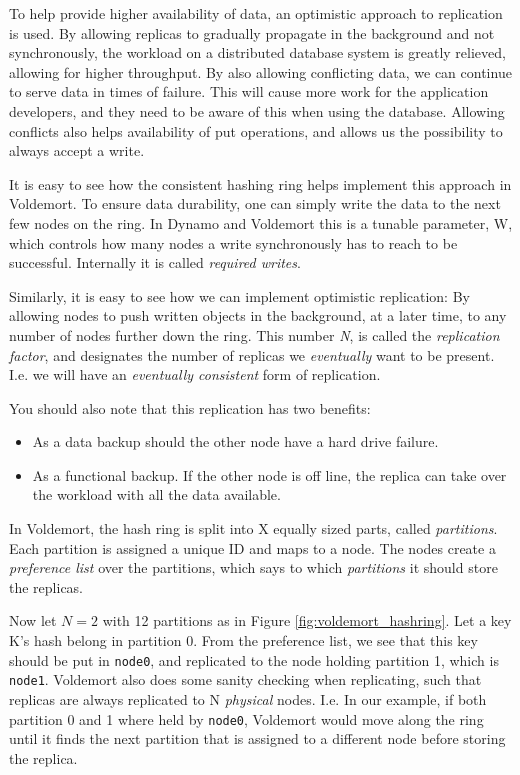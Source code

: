 To help provide higher availability of data, an optimistic approach to replication is used.
By allowing replicas to gradually propagate in the background and not synchronously, the workload on a distributed database system is greatly relieved, allowing for higher throughput. By also allowing conflicting data, we can continue to serve data in times of failure. This will cause more work for the application developers, and they need to be aware of this when using the database. Allowing conflicts also helps availability of put operations, and allows us the possibility to always accept a write.

It is easy to see how the consistent hashing ring helps implement this approach in Voldemort.
To ensure data durability, one can simply write the data to the next few nodes on the ring. In Dynamo and Voldemort this is a tunable parameter, W, which controls how many nodes a write synchronously has to reach to be successful. 
Internally it is called \emph{required writes}.

Similarly, it is easy to see how we can implement optimistic replication:
By allowing nodes to push written objects in the background, at a later time, to any number of nodes further down the ring.
This number \emph{N}, is called the \emph{replication factor}, and designates the number of replicas we \emph{eventually} want to be present.
I.e. we will have an \emph{eventually consistent} form of replication.

You should also note that this replication has two benefits: 
\begin{itemize}
	\item As a data backup should the other node have a hard drive failure.
	\item As a functional backup. If the other node is off line, the replica can take over the workload with all the data available.
\end{itemize}

In Voldemort, the hash ring is split into X equally sized parts, called \emph{partitions}. Each partition is assigned a unique ID and maps to a node.
The nodes create a \emph{preference list} over the partitions, which says to which \emph{partitions} it should store the replicas.

Now let $N=2$ with 12 partitions as in Figure \ref{fig:voldemort_hashring}. 
Let a key K's hash belong in partition 0. From the preference list, we see that this key should be put in \texttt{node0}, and replicated to the node holding partition 1, which is \texttt{node1}.
Voldemort also does some sanity checking when replicating, such that replicas are always replicated to N \emph{physical} nodes. 
I.e. In our example, if both partition 0 and 1 where held by \texttt{node0}, Voldemort would move along the ring until it finds the next partition that is assigned to a different node before storing the replica.

